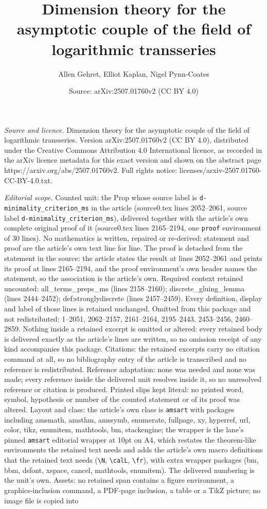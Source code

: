 \documentclass[10pt,a4paper]{amsart}
\title[Dimension theory for the asymptotic couple of the field of l]{Dimension theory for the asymptotic couple of the field of logarithmic transseries}
\author{Allen Gehret, Elliot Kaplan, Nigel Pynn-Coates}
\date{Source: arXiv:2507.01760v2 (CC BY 4.0)}
\begin{document}
\maketitle

\noindent\emph{Source and licence.} Dimension theory for the asymptotic couple of the field of logarithmic transseries. Version arXiv:2507.01760v2 (CC BY 4.0), distributed under the Creative Commons Attribution 4.0 International licence, as recorded in the arXiv licence metadata for this exact version and shown on the abstract page https://arxiv.org/abs/2507.01760v2. Full rights notice: licenses/arxiv-2507.01760-CC-BY-4.0.txt.\par\smallskip

\noindent\textit{Editorial scope.} Counted unit: the Prop whose source label is \texttt{d-minimality\_criterion\_ms} in the article (source0.tex lines 2052--2061, source label \texttt{d-minimality\_criterion\_ms}), delivered together with the article's own complete original proof of it (source0.tex lines 2165--2194, one \texttt{proof} environment of 30 lines). No mathematics is written, repaired or re-derived: statement and proof are the article's own text line for line. The proof is detached from the statement in the source: the article states the result at lines 2052--2061 and prints its proof at lines 2165--2194, and the proof environment's own header names the statement, so the association is the article's own. Required context retained uncounted: all\_terms\_preps\_ms (lines 2158--2160); discrete\_gluing\_lemma (lines 2444--2452); def:stronglydiscrete (lines 2457--2459). Every definition, display and label of those lines is retained unchanged. Omitted from this package and not redistributed: 1--2051, 2062--2157, 2161--2164, 2195--2443, 2453--2456, 2460--2859. Nothing inside a retained excerpt is omitted or altered: every retained body is delivered exactly as the article's lines are written, so no omission receipt of any kind accompanies this package. Citations: the retained excerpts carry no citation command at all, so no bibliography entry of the article is transcribed and no reference is redistributed. Reference adaptation: none was needed and none was made; every reference inside the delivered unit resolves inside it, so no unresolved reference or citation is produced. Printed slips kept literal: no printed word, symbol, hypothesis or number of the counted statement or of its proof was altered. Layout and class: the article's own class is \texttt{amsart} with packages including amsmath, amsthm, amssymb, enumerate, fullpage, xy, hyperref, url, color, tikz, enumitem, mathtools, bm, stackengine; the wrapper is the lane's pinned \texttt{amsart} editorial wrapper at 10pt on A4, which restates the theorem-like environments the retained text needs and adds the article's own macro definitions that the retained text needs (\texttt{\textbackslash N}, \texttt{\textbackslash calL}, \texttt{\textbackslash fr}), with extra wrapper packages (bm, bbm, dsfont, xspace, cancel, mathtools, enumitem). The delivered numbering is the unit's own. Assets: no retained span contains a figure environment, a graphics-inclusion command, a PDF-page inclusion, a table or a TikZ picture; no image file is copied into 
\end{document}
